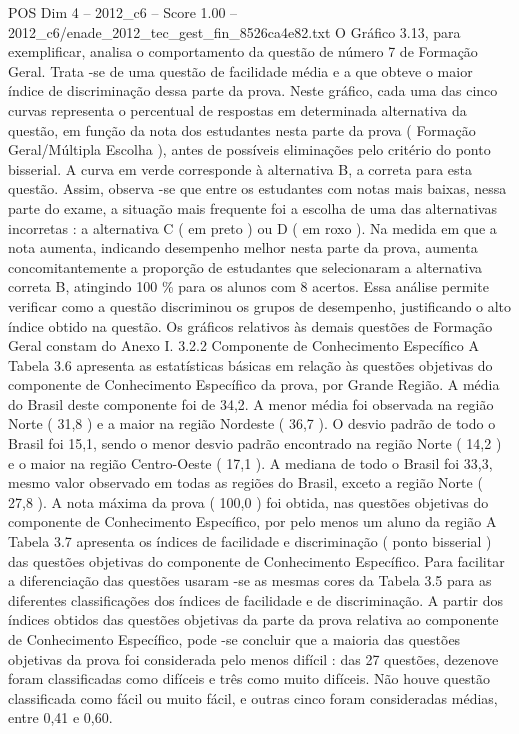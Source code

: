 \begin{textsample}{POS Dim 4 – 2012\_c6 – Score 1.00 – 2012\_c6/enade\_2012\_tec\_gest\_fin\_8526ca4e82.txt}
O Gráfico 3.13, para exemplificar, analisa o comportamento da questão de número 7 de Formação Geral.
Trata -se de uma questão de facilidade média e a que obteve o maior índice de discriminação dessa parte da prova.
Neste gráfico, cada uma das cinco curvas representa o percentual de respostas em determinada alternativa da questão, em função da nota dos estudantes nesta parte da prova ( Formação Geral/Múltipla Escolha ), antes de possíveis eliminações pelo critério do ponto bisserial.
A curva em verde corresponde à alternativa B, a correta para esta questão.
Assim, observa -se que entre os estudantes com notas mais baixas, nessa parte do exame, a situação mais frequente foi a escolha de uma das alternativas incorretas : a alternativa C ( em preto ) ou D ( em roxo ).
Na medida em que a nota aumenta, indicando desempenho melhor nesta parte da prova, aumenta concomitantemente a proporção de estudantes que selecionaram a alternativa correta B, atingindo 100 \% para os alunos com 8 acertos.
Essa análise permite verificar como a questão discriminou os grupos de desempenho, justificando o alto índice obtido na questão.
Os gráficos relativos às demais questões de Formação Geral constam do Anexo I. 3.2.2 Componente de Conhecimento Específico A Tabela 3.6 apresenta as estatísticas básicas em relação às questões objetivas do componente de Conhecimento Específico da prova, por Grande Região.
A média do Brasil deste componente foi de 34,2.
A menor média foi observada na região Norte ( 31,8 ) e a maior na região Nordeste ( 36,7 ).
O desvio padrão de todo o Brasil foi 15,1, sendo o menor desvio padrão encontrado na região Norte ( 14,2 ) e o maior na região Centro-Oeste ( 17,1 ).
A mediana de todo o Brasil foi 33,3, mesmo valor observado em todas as regiões do Brasil, exceto a região Norte ( 27,8 ).
A nota máxima da prova ( 100,0 ) foi obtida, nas questões objetivas do componente de Conhecimento Específico, por pelo menos um aluno da região A Tabela 3.7 apresenta os índices de facilidade e discriminação ( ponto bisserial ) das questões objetivas do componente de Conhecimento Específico.
Para facilitar a diferenciação das questões usaram -se as mesmas cores da Tabela 3.5 para as diferentes classificações dos índices de facilidade e de discriminação.
A partir dos índices obtidos das questões objetivas da parte da prova relativa ao componente de Conhecimento Específico, pode -se concluir que a maioria das questões objetivas da prova foi considerada pelo menos difícil : das 27 questões, dezenove foram classificadas como difíceis e três como muito difíceis.
Não houve questão classificada como fácil ou muito fácil, e outras cinco foram consideradas médias, entre 0,41 e 0,60.

\end{textsample}
